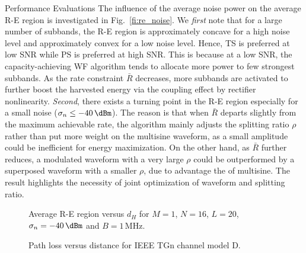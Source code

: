 \documentclass[journal]{IEEEtran}
\begin{document}
\begin{section}{Performance Evaluations}
		The influence of the average noise power on the average R-E region is investigated in Fig.~\ref{fi:re_noise}. We \textit{first} note that for a large number of subbands, the R-E region is approximately concave for a high noise level and approximately convex for a low noise level. Hence, TS is preferred at low SNR while PS is preferred at high SNR. This is because at a low SNR, the capacity-achieving WF algorithm tends to allocate more power to few strongest subbands. As the rate constraint $\bar{R}$ decreases, more subbands are activated to further boost the harvested energy via the coupling effect by rectifier nonlinearity. \textit{Second}, there exists a turning point in the R-E region especially for a small noise ($\sigma_n \le -40\,\si{\dBm}$). The reason is that when $\bar{R}$ departs slightly from the maximum achievable rate, the algorithm mainly adjusts the splitting ratio $\rho$ rather than put more weight on the multisine waveform, as a small amplitude could be inefficient for energy maximization. On the other hand, as $\bar{R}$ further reduces, a modulated waveform with a very large $\rho$ could be outperformed by a superposed waveform with a smaller $\rho$, due to advantage the of multisine. The result highlights the necessity of joint optimization of waveform and splitting ratio.

		\begin{figure}[!t]
			\centering
			\begin{adjustbox}{width=\linewidth}
				
			\end{adjustbox}
			\caption{Average R-E region versus $d_H$ for $M=1$, $N=16$, $L=20$, $\sigma_n=-40\,\si{\dBm}$ and $B=1\,\si{\MHz}$.}
			\label{fi:re_distance}
		\end{figure}

		\begin{figure}[!t]
			\centering
			\begin{adjustbox}{width=\linewidth}
				
			\end{adjustbox}
			\caption{Path loss versus distance for IEEE TGn channel model D.}
			\label{fi:path_loss}
		\end{figure}


\end{section}
\end{document}
